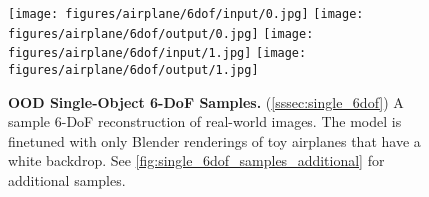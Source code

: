 \begin{figure}[t]
\centering
\texttt{[image: figures/airplane/6dof/input/0.jpg]}\hfill
\texttt{[image: figures/airplane/6dof/output/0.jpg]}\hfill
\texttt{[image: figures/airplane/6dof/input/1.jpg]}\hfill
\texttt{[image: figures/airplane/6dof/output/1.jpg]}
\caption{\textbf{OOD Single-Object 6-DoF Samples.} (\cref{sssec:single_6dof})
A sample 6-DoF reconstruction of real-world images.
The model is finetuned with only Blender renderings of toy airplanes that have a white backdrop.
See \cref{fig:single_6dof_samples_additional} for additional samples.
}
\label{fig:single_6dof_samples}
\end{figure}